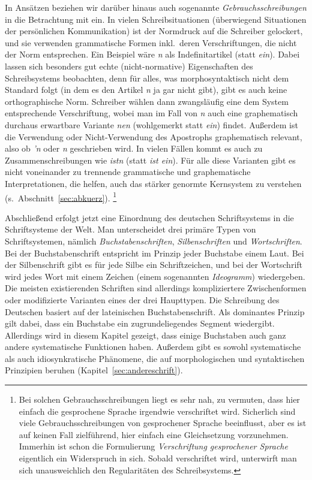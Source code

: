In Ansätzen beziehen wir darüber hinaus auch sogenannte \textit{Gebrauchsschreibungen} in die Betrachtung mit ein.
In vielen Schreibsituationen (überwiegend Situationen der persönlichen Kommunikation) ist der Normdruck auf die Schreiber gelockert, und sie verwenden grammatische Formen inkl.\ deren Verschriftungen, die nicht der Norm entsprechen.
Ein Beispiel wäre \textit{n} als Indefinitartikel (statt \textit{ein}).
Dabei lassen sich besonders gut echte (nicht-normative) Eigenschaften des Schreibsystems beobachten, denn für alles, was morphosyntaktisch nicht dem Standard folgt (in dem es den Artikel \textit{n} ja gar nicht gibt), gibt es auch keine orthographische Norm.
Schreiber wählen dann zwangsläufig eine dem System entsprechende Verschriftung, wobei man im Fall von \textit{n} auch eine graphematisch durchaus erwartbare Variante \textit{nen} (wohlgemerkt statt \textit{ein}) findet.
Außerdem ist die Verwendung oder Nicht-Verwendung des Apostrophs graphematisch relevant, also ob \textit{'n} oder \textit{n} geschrieben wird.
In vielen Fällen kommt es auch zu Zusammenschreibungen wie \textit{istn} (statt \textit{ist ein}).
Für alle diese Varianten gibt es nicht voneinander zu trennende grammatische und graphematische Interpretationen, die helfen, auch das stärker genormte Kernsystem zu verstehen (s.\ Abschnitt~\ref{sec:abkuerz}).%
\footnote{Bei solchen Gebrauchsschreibungen liegt es sehr nah, zu vermuten, dass hier einfach die gesprochene Sprache irgendwie verschriftet wird.
Sicherlich sind viele Gebrauchsschreibungen von gesprochener Sprache beeinflusst, aber es ist auf keinen Fall zielführend, hier einfach eine Gleichsetzung vorzunehmen.
Immerhin ist schon die Formulierung \textit{Verschriftung gesprochener Sprache} eigentlich ein Widerspruch in sich.
Sobald verschriftet wird, unterwirft man sich unausweichlich den Regularitäten des Schreibsystems.}

Abschließend erfolgt jetzt eine Einordnung des deutschen Schriftsystems in die Schriftsysteme der Welt.
Man unterscheidet drei primäre Typen von Schriftsystemen, nämlich \textit{Buchstabenschriften}, \textit{Silbenschriften} und \textit{Wortschriften}.
Bei der Buchstabenschrift entspricht im Prinzip jeder Buchstabe einem Laut.
Bei der Silbenschrift gibt es für jede Silbe ein Schriftzeichen, und bei der Wortschrift wird jedes Wort mit einem Zeichen (einem sogenannten \textit{Ideogramm}) wiedergeben.
Die meisten existierenden Schriften sind allerdings kompliziertere Zwischenformen oder modifizierte Varianten eines der drei Haupttypen.
Die Schreibung des Deutschen basiert auf der lateinischen Buchstabenschrift.
Als dominantes Prinzip gilt dabei, dass ein Buchstabe ein zugrundeliegendes Segment wiedergibt.
Allerdings wird in diesem Kapitel gezeigt, dass einige Buchstaben auch ganz andere systematische Funktionen haben.
Außerdem gibt es sowohl systematische als auch idiosynkratische Phänomene, die auf morphologischen und syntaktischen Prinzipien beruhen (Kapitel~\ref{sec:andereschrift}).

